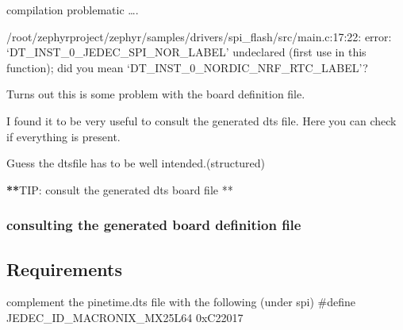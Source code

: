 \documentclass[letterpaper,10pt,english]{sphinxmanual}
\begin{document}
compilation problematic ….

/root/zephyrproject/zephyr/samples/drivers/spi\_flash/src/main.c:17:22: error: ‘DT\_INST\_0\_JEDEC\_SPI\_NOR\_LABEL’ undeclared (first use in this function); did you mean ‘DT\_INST\_0\_NORDIC\_NRF\_RTC\_LABEL’?

Turns out this is some problem with the board definition file.

I found it to be very useful to consult the generated dts file.
Here you can check if everything is present.

Guess the dts\sphinxhyphen{}file has to be well intended.(structured)

{\color{red}\bfseries{}**}TIP: consult the generated dts board file **


\subsubsection{consulting the generated board definition file}
\label{\detokenize{drivers/spinor:consulting-the-generated-board-definition-file}}
\begin{sphinxVerbatim}[commandchars=\\\{\}]
\end{sphinxVerbatim}


\subsection{Requirements}
\label{\detokenize{drivers/spinor:requirements}}
complement the pinetime.dts file with the following (under spi)
\#define JEDEC\_ID\_MACRONIX\_MX25L64      0xC22017
\end{document}
